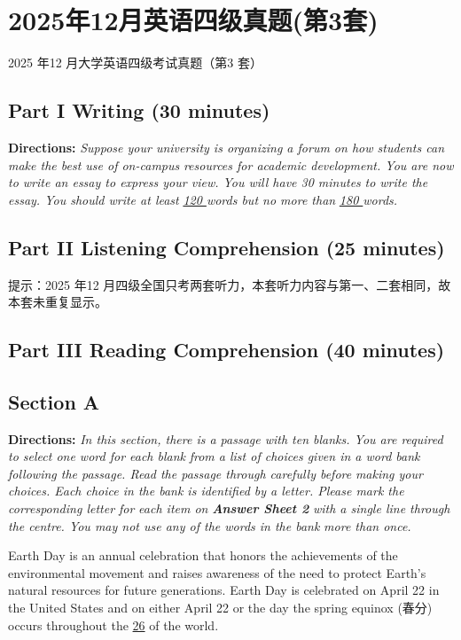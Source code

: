 \documentclass[UTF8,11pt]{ctexart}
\begin{document}
\section*{2025年12月英语四级真题(第3套)}
2025 年12 月大学英语四级考试真题（第3 套）


\subsection*{\textbf{Part I Writing} \textbf{(30 minutes)}}


\textbf{Directions:} \textit{Suppose your university is organizing a forum on how students can make the best use of on-campus} \textit{resources for academic development. You are now to write an essay to express your view. You will have 30 minutes} \textit{to write the essay. You should write at least }\textit{\uline{120 }}\textit{words but no more than }\textit{\uline{180 }}\textit{words.}


\subsection*{\textbf{Part II} \textbf{Listening Comprehension} \textbf{(25 minutes)}}


提示：2025 年12 月四级全国只考两套听力，本套听力内容与第一、二套相同，故本套未重复显示。


\subsection*{\textbf{Part III Reading Comprehension (40 minutes)}}


\subsection*{\textbf{Section A}}


\textbf{Directions:} \textit{In this section, there is a passage with ten blanks. You are required to select one word for each blank} \textit{from a list of choices given in a word bank following the passage. Read the passage through carefully before} \textit{making your choices. Each choice in the bank is identified by a letter. Please mark the corresponding letter for} \textit{each item on }\textbf{\textit{Answer Sheet 2}}\textit{ with a single line through the centre. You may not use any of the words in the bank} \textit{more than once.}


Earth Day is an annual celebration that honors the achievements of the environmental movement and raises awareness of the need to protect Earth’s natural resources for future generations. Earth Day is celebrated on April 22 in the United States and on either April 22 or the day the spring equinox (春分) occurs throughout the \uline{26} of the world.
\end{document}
